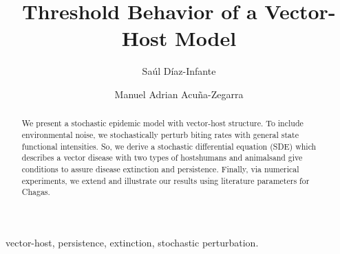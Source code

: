 \begin{frontmatter}
    \title{
        Threshold Behavior  of a Vector-Host Model
    }
    \author[add:conacyt_unison]{%
    Sa\'ul D\'iaz-Infante%
    }%
    \author[add:unison]{%
        Manuel Adrian Acu\~na-Zegarra
    }%
    \address[add:conacyt_unison]{
        CONACYT-Universidad de Sonora, 
        Departamento de Matem\'aticas, Boulevard Luis Encinas y 
        Rosales S/N, 83000, Hermosillo, Sonora, M\'exico.
    }
%
    \address[add:unison]{
        Departamento de Matem\'aticas, Universidad de Sonora, Boulevard
        Luis Encinas y Rosales S/N, Col. Centro, Hermosillo, Sonora, 
        M\'exico.
    }
    \begin{abstract}
        We present a stochastic epidemic model with vector-host structure. To 
        include environmental noise, we stochastically perturb biting rates 
        with general state functional intensities. So, we derive a stochastic 
        differential equation (SDE) which describes a vector disease with two 
        types of hosts\textemdash humans and animals\textemdash and give 
        conditions to assure disease extinction and persistence. Finally, via 
        numerical experiments, we extend and illustrate our results using 
        literature parameters for Chagas.
    \end{abstract}
    \begin{keyword}
        vector-host,
        persistence,
        extinction,  
        stochastic 
        perturbation.
    \end{keyword}
\end{frontmatter}